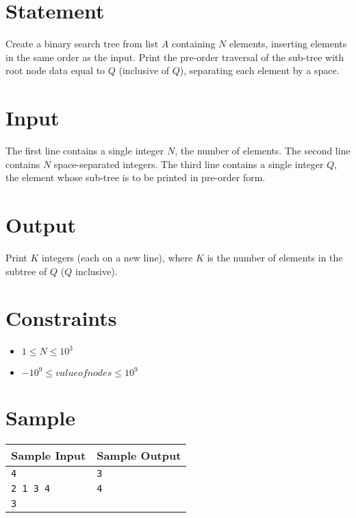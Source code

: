 \documentclass{article}
\begin{document}
\section*{Statement}

Create a binary search tree from list $A$ containing $N$ elements, inserting elements in the same order as the input. Print the pre-order traversal of the sub-tree with root node data equal to $Q$ (inclusive of $Q$), separating each element by a space.

\section*{Input}

The first line contains a single integer $N$, the number of elements. The second line contains $N$ space-separated integers. The third line contains a single integer $Q$, the element whose sub-tree is to be printed in pre-order form. 

\section*{Output}

Print $K$ integers (each on a new line), where $K$ is the number of elements in the subtree of $Q$ ($Q$ inclusive).

\section*{Constraints}

\begin{itemize}
    \item $1 \le N \le 10^{3}$
    \item $-10^{9} \le valueofnodes \le 10^{9}$
\end{itemize}

\section*{Sample}

\begin{tabular}{l|l}
    \hline
    \hline
    Sample Input & Sample Output \\
    \hline
    \verb+4+ & \verb+3+ \\
    \verb+2 1 3 4+ & \verb+4+ \\
    \verb+3+ & \verb++ \\
    \hline
\end{tabular}
\end{document}
